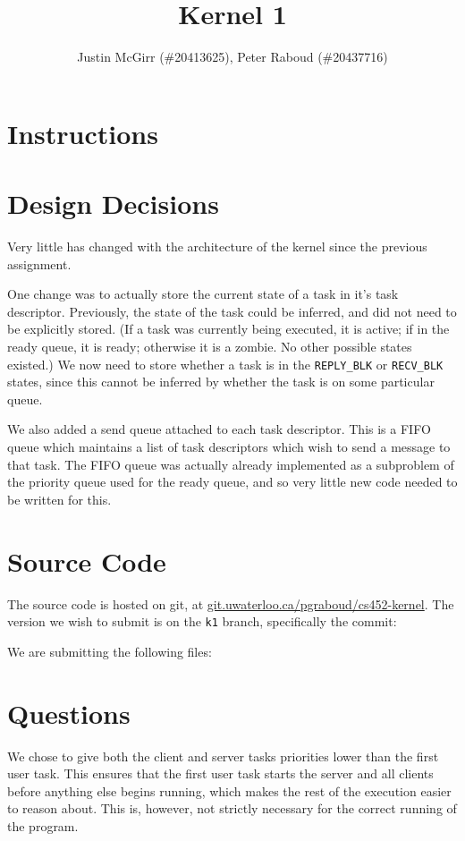 \documentclass[titlepage]{article}
\begin{document}
\title{Kernel 1}
\author{Justin McGirr (\#20413625), Peter Raboud (\#20437716)}
\maketitle

\section{Instructions}


\section{Design Decisions}
Very little has changed with the architecture of the kernel since the previous assignment.

One change was to actually store the current state of a task in it's task descriptor.
Previously, the state of the task could be inferred, and did not need to be explicitly stored.
(If a task was currently being executed, it is active; if in the ready queue, it is ready; otherwise
it is a zombie. No other possible states existed.)
We now need to store whether a task is in the \texttt{REPLY\_BLK} or \texttt{RECV\_BLK} states,
since this cannot be inferred by whether the task is on some particular queue.

We also added a send queue attached to each task descriptor.
This is a FIFO queue which maintains a list of task descriptors which wish to send a message
to that task.
The FIFO queue was actually already implemented as a subproblem of the priority queue used
for the ready queue, and so very little new code needed to be written for this.

\section{Source Code}
The source code is hosted on git, at \url{git.uwaterloo.ca/pgraboud/cs452-kernel}.
The version we wish to submit is on the \texttt{k1} branch, specifically
the commit:

We are submitting the following files:


\section{Questions}

We chose to give both the client and server tasks priorities lower than
the first user task.
This ensures that the first user task starts the server and all clients
before anything else begins running, which makes the rest of the execution
easier to reason about.
This is, however, not strictly necessary for the correct running of the program.
\end{document}
